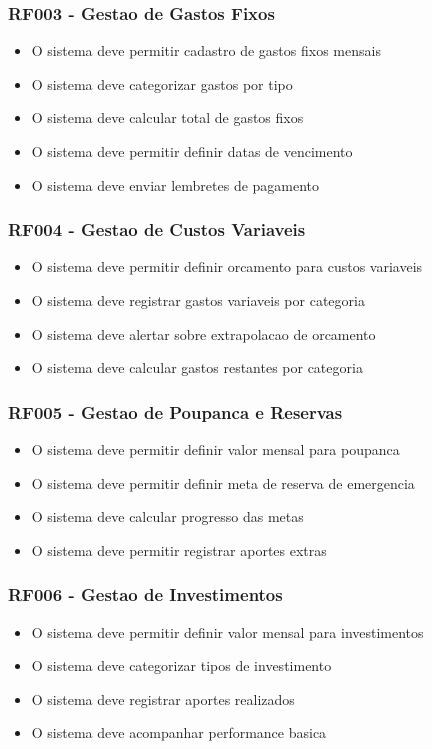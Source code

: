 \subsubsection{RF003 - Gestao de Gastos Fixos}
\begin{itemize}
    \item O sistema deve permitir cadastro de gastos fixos mensais
    \item O sistema deve categorizar gastos por tipo
    \item O sistema deve calcular total de gastos fixos
    \item O sistema deve permitir definir datas de vencimento
    \item O sistema deve enviar lembretes de pagamento
\end{itemize}

\subsubsection{RF004 - Gestao de Custos Variaveis}
\begin{itemize}
    \item O sistema deve permitir definir orcamento para custos variaveis
    \item O sistema deve registrar gastos variaveis por categoria
    \item O sistema deve alertar sobre extrapolacao de orcamento
    \item O sistema deve calcular gastos restantes por categoria
\end{itemize}

\subsubsection{RF005 - Gestao de Poupanca e Reservas}
\begin{itemize}
    \item O sistema deve permitir definir valor mensal para poupanca
    \item O sistema deve permitir definir meta de reserva de emergencia
    \item O sistema deve calcular progresso das metas
    \item O sistema deve permitir registrar aportes extras
\end{itemize}

\subsubsection{RF006 - Gestao de Investimentos}
\begin{itemize}
    \item O sistema deve permitir definir valor mensal para investimentos
    \item O sistema deve categorizar tipos de investimento
    \item O sistema deve registrar aportes realizados
    \item O sistema deve acompanhar performance basica
\end{itemize}

